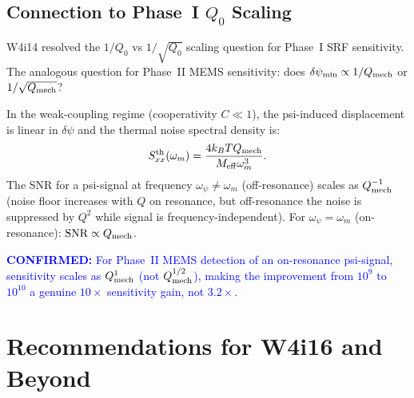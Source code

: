 \documentclass[11pt]{article}
\theoremstyle{definition}
\theoremstyle{remark}
\newcommand{\Qmech}{Q_{\rm mech}}
\newcommand{\SNR}{\mathrm{SNR}}
\newcommand{\confirmed}[1]{\textcolor{blue}{\textbf{CONFIRMED:} #1}}
\begin{document}
\subsection{Connection to Phase~I $Q_0$ Scaling}

W4i14 resolved the $1/Q_0$ vs $1/\sqrt{Q_0}$ scaling question
for Phase~I SRF sensitivity. The analogous question for Phase~II
MEMS sensitivity: does $\delta\psi_{\rm min} \propto 1/\Qmech$ or
$1/\sqrt{\Qmech}$?

In the weak-coupling regime (cooperativity $C \ll 1$), the
psi-induced displacement is linear in $\delta\psi$ and the thermal
noise spectral density is:
\begin{equation}
S_{xx}^{\rm th}(\omega_m) = \frac{4 k_B T \Qmech}{M_{\rm eff}
\omega_m^3}.
\end{equation}
The SNR for a psi-signal at frequency $\omega_\psi \neq \omega_m$
(off-resonance) scales as $\Qmech^{-1}$ (noise floor increases
with $Q$ on resonance, but off-resonance the noise is suppressed
by $Q^2$ while signal is frequency-independent). For $\omega_\psi
= \omega_m$ (on-resonance): $\SNR \propto \Qmech$.

\confirmed{For Phase~II MEMS detection of an on-resonance
psi-signal, sensitivity scales as $\Qmech^{1}$ (not $\Qmech^{1/2}$),
making the improvement from $10^9$ to $10^{10}$ a genuine
$10\times$ sensitivity gain, not $3.2\times$.}


\section{Recommendations for W4i16 and Beyond}
\label{sec:next}
\end{document}
